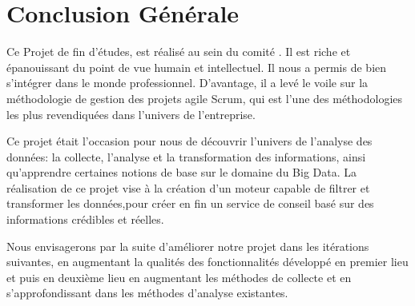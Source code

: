 \chapter*{Conclusion Générale}




Ce Projet de fin d’études, est réalisé au sein du comité .  Il est riche et épanouissant du point de vue humain et intellectuel.
Il nous a permis de bien s’intégrer dans le monde professionnel.  D’avantage,
il a levé le voile sur la méthodologie de gestion des projets agile Scrum, qui
est l’une des méthodologies les plus revendiquées dans l’univers de
l’entreprise.

Ce projet était l’occasion pour nous de découvrir l’univers de l'analyse des
données: la collecte, l'analyse et la transformation des informations, ainsi
qu’apprendre certaines notions de base sur le domaine du Big Data.  La
réalisation de ce  projet vise à la création d'un moteur capable de filtrer et
transformer les données,pour créer en fin un service de conseil basé sur des
informations crédibles et réelles.

Nous envisagerons par la suite d’améliorer notre projet dans les itérations
suivantes, en augmentant la qualités des fonctionnalités développé en premier
lieu et puis en deuxième lieu en augmentant les méthodes de collecte et en
s'approfondissant dans les méthodes d'analyse existantes.